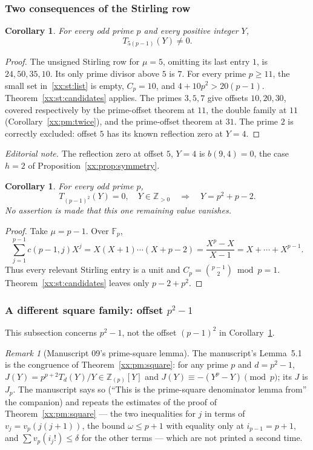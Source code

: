 \documentclass[11pt,a4paper]{article}
\numberwithin{equation}{section}
\newtheorem{corollary}[theorem]{Corollary}
\theoremstyle{definition}
\theoremstyle{remark}
\newtheorem{remark}[theorem]{Remark}
\theoremstyle{plain}
\newcommand{\Z}{\mathbb Z}
\begin{document}
\subsubsection{Two consequences of the Stirling row}

\begin{corollary}\label{xx:st:five}
For every odd prime $p$ and every positive integer $Y$,
\[
 T_{5(p-1)}(Y)\ne0.
\]
\end{corollary}
\begin{proof}
The unsigned Stirling row for $\mu=5$, omitting its last entry $1$, is
$24,50,35,10$. Its only prime divisor above $5$ is $7$. For every prime
$p\ge11$, the small set in~\eqref{xx:st:list} is empty, $C_p=10$, and
$4+10p^2>20(p-1)$. Theorem~\ref{xx:st:candidates} applies.
The primes $3,5,7$ give offsets $10,20,30$, covered respectively by the
prime-offset theorem at $11$, the double family at $11$
(Corollary~\ref{xx:pm:twice}), and the prime-offset theorem at $31$. The prime
$2$ is correctly excluded: offset $5$ has its known reflection zero at $Y=4$.
\end{proof}

\emph{Editorial note.}  The reflection zero at offset $5$, $Y=4$ is
$b(9,4)=0$, the case $h=2$ of Proposition~\ref{xx:prop:symmetry}.

\begin{corollary}\label{xx:st:squares}
For every odd prime $p$,
\[
 T_{(p-1)^2}(Y)=0,\quad Y\in\Z_{>0}
 \quad\Longrightarrow\quad Y=p^2+p-2.
\]
No assertion is made that this one remaining value vanishes.
\end{corollary}
\begin{proof}
Take $\mu=p-1$. Over $\mathbb F_p$,
\[
 \sum_{j=1}^{p-1}c(p-1,j)X^j
 =X(X+1)\cdots(X+p-2)
 =\frac{X^p-X}{X-1}=X+\cdots+X^{p-1}.
\]
Thus every relevant Stirling entry is a unit and
$C_p=\binom{p-1}2\bmod p=1$. Theorem~\ref{xx:st:candidates} leaves only
$p-2+p^2$.
\end{proof}

\subsubsection{A different square family: offset \texorpdfstring{$p^2-1$}{p squared minus one}}

This subsection concerns $p^2-1$, not the offset $(p-1)^2$ in
Corollary~\ref{xx:st:squares}.

\begin{remark}[Manuscript 09's prime-square lemma]\label{xx:st:prime-square-base}
The manuscript's Lemma~5.1 is the congruence of Theorem~\ref{xx:pm:square}: for
any prime $p$ and $d=p^2-1$, $J(Y)=p^{p+2}T_d(Y)/Y\in\Z_{(p)}[Y]$ and
$J(Y)\equiv-(Y^p-Y)\pmod p$; its $J$ is $J_p$.  The manuscript says so
(``This is the prime-square denominator lemma from'' the companion) and repeats
the estimates of the proof of Theorem~\ref{xx:pm:square} --- the two
inequalities for $j$ in terms of $v_j=v_p(j(j+1))$, the bound $\omega\le p+1$
with equality only at $i_{p-1}=p+1$, and $\sum v_p(i_j!)\le\delta$ for the other
terms --- which are not printed a second time.
\end{remark}
\end{document}
